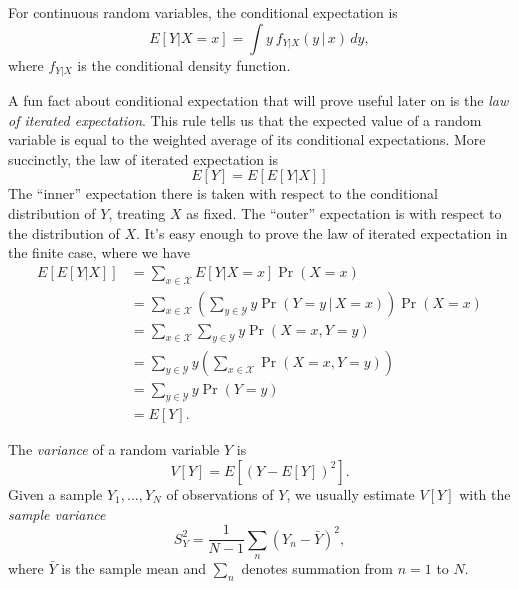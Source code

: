 \documentclass[
  12pt,
  oneside,openany]{book}
\begin{document}
For continuous random variables, the conditional expectation is
\begin{equation}
E[Y | X = x]
= \int y \: f_{Y|X} (y \,|\, x) \, dy,
\end{equation}
where \(f_{Y|X}\) is the conditional density function.

A fun fact about conditional expectation that will prove useful later on is the \emph{law of iterated expectation}.
This rule tells us that the expected value of a random variable is equal to the weighted average of its conditional expectations.
More succinctly, the law of iterated expectation is
\[
E[Y] = E[ E[Y | X] ]
\]
The ``inner'' expectation there is taken with respect to the conditional distribution of \(Y\), treating \(X\) as fixed.
The ``outer'' expectation is with respect to the distribution of \(X\).
It's easy enough to prove the law of iterated expectation in the finite case, where we have
\[
\begin{aligned}
E[ E[Y | X] ]
&= \sum_{x \in \mathcal{X}} E[Y | X = x] \Pr(X = x) \\
&= \sum_{x \in \mathcal{X}} \left( \sum_{y \in \mathcal{Y}} y \Pr(Y = y \,|\, X = x) \right) \Pr(X = x) \\
&= \sum_{x \in \mathcal{X}} \sum_{y \in \mathcal{Y}} y \Pr(X = x, Y = y) \\
&= \sum_{y \in \mathcal{Y}} y \left( \sum_{x \in \mathcal{X}} \Pr(X = x, Y = y) \right) \\
&= \sum_{y \in \mathcal{Y}} y \Pr(Y = y) \\
&= E[Y].
\end{aligned}
\]

The \emph{variance} of a random variable \(Y\) is
\begin{equation}
V[Y] = E[(Y - E[Y])^2].
\end{equation}
Given a sample \(Y_1, \ldots, Y_N\) of observations of \(Y\), we usually estimate \(V[Y]\) with the \emph{sample variance}
\begin{equation}
S_Y^2 = \frac{1}{N-1} \sum_n (Y_n - \bar{Y})^2,
\end{equation}
where \(\bar{Y}\) is the sample mean and \(\sum_n\) denotes summation from \(n = 1\) to \(N\).
\end{document}
